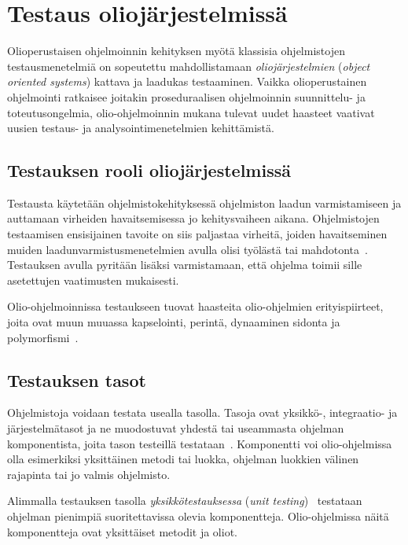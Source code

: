 \documentclass[finnish, grading]{tktltiki2}
\theoremstyle{definition}
\theoremstyle{remark}
\begin{document}


\section{Testaus oliojärjestelmissä}

Olioperustaisen ohjelmoinnin kehityksen myötä klassisia ohjelmistojen testausmenetelmiä on sopeutettu mahdollistamaan \textit{oliojärjestelmien} (\textit{object oriented systems}) kattava ja laadukas testaaminen. Vaikka olioperustainen ohjelmointi ratkaisee joitakin proseduraalisen ohjelmoinnin suunnittelu- ja toteutusongelmia, olio-ohjelmoinnin mukana tulevat uudet haasteet vaativat uusien testaus- ja analysointimenetelmien kehittämistä. 

\subsection{Testauksen rooli oliojärjestelmissä}

Testausta käytetään ohjelmistokehityksessä ohjelmiston laadun varmistamiseen ja auttamaan virheiden havaitsemisessa jo kehitysvaiheen aikana. Ohjelmistojen testaamisen ensisijainen tavoite on siis paljastaa virheitä, joiden havaitseminen muiden laadunvarmistusmenetelmien avulla olisi työlästä tai mahdotonta~\cite[s. 59]{Binder:1999}. Testauksen avulla pyritään lisäksi varmistamaan, että ohjelma toimii sille asetettujen vaatimusten mukaisesti. 

Olio-ohjelmoinnissa testaukseen tuovat haasteita olio-ohjelmien erityispiirteet, joita ovat muun muuassa kapselointi, perintä, dynaaminen sidonta ja polymorfismi~\cite[s. 86]{Mariani:Pezze:2008}. 


\subsection{Testauksen tasot}

Ohjelmistoja voidaan testata usealla tasolla. Tasoja ovat yksikkö-, integraatio- ja järjestelmätasot ja ne muodostuvat yhdestä tai useammasta ohjelman komponentista, joita tason testeillä testataan~\cite[s. 45]{Binder:1999}. Komponentti voi olio-ohjelmissa olla esimerkiksi yksittäinen metodi tai luokka, ohjelman luokkien välinen rajapinta tai jo valmis ohjelmisto.

Alimmalla testauksen tasolla \textit{yksikkötestauksessa} (\textit{unit testing})~\cite[s. 45]{Binder:1999} testataan ohjelman pienimpiä suoritettavissa olevia komponentteja. Olio-ohjelmissa näitä komponentteja ovat yksittäiset metodit ja oliot. 
\end{document}
